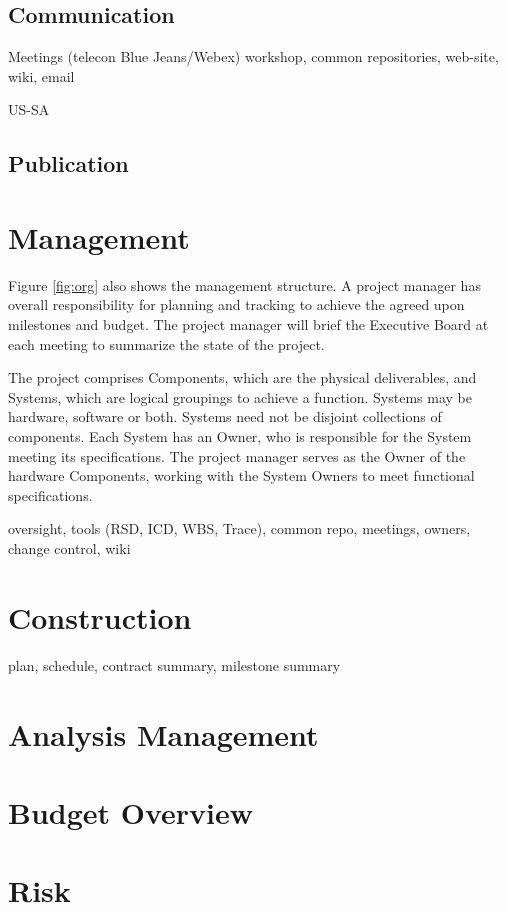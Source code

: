 \documentclass[preprint]{aastex}
\begin{document}
\subsection{Communication}
Meetings (telecon Blue Jeans/Webex)  workshop, common repositories, web-site, wiki, email

US-SA

\subsection{Publication}


\section{Management}
Figure \ref{fig:org} also shows the management structure. A project manager has
overall responsibility for planning and tracking to achieve the agreed upon
milestones and budget. The project manager will brief the Executive Board at each
meeting to summarize the state of the project.

The project comprises Components, which are the physical deliverables, and Systems,
which are logical groupings to achieve a function. Systems may be hardware, software
or both. Systems need not be disjoint collections of components. Each System has an
Owner, who is responsible for the System meeting its specifications. The project
manager serves as the Owner of the hardware Components, working with the System
Owners to meet functional specifications.

oversight, tools (RSD, ICD, WBS, Trace), common repo, meetings, owners, change control, wiki

\section{Construction}
plan, schedule, contract summary, milestone summary

\section{Analysis Management}

\section{Budget Overview}

\section{Risk}
\end{document}
